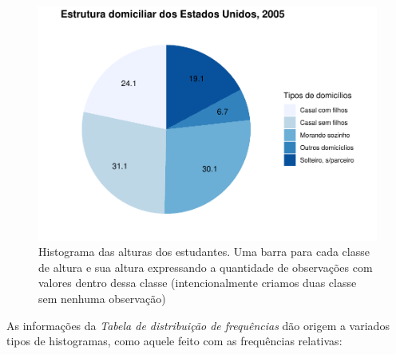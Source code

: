 \documentclass[
]{book}
\newenvironment{Shaded}{\begin{snugshade}}{\end{snugshade}}
\newcommand{\AttributeTok}[1]{\textcolor[rgb]{0.77,0.63,0.00}{#1}}
\newcommand{\DecValTok}[1]{\textcolor[rgb]{0.00,0.00,0.81}{#1}}
\newcommand{\FloatTok}[1]{\textcolor[rgb]{0.00,0.00,0.81}{#1}}
\newcommand{\FunctionTok}[1]{\textcolor[rgb]{0.00,0.00,0.00}{#1}}
\newcommand{\NormalTok}[1]{#1}
\newcommand{\OtherTok}[1]{\textcolor[rgb]{0.56,0.35,0.01}{#1}}
\newcommand{\SpecialCharTok}[1]{\textcolor[rgb]{0.00,0.00,0.00}{#1}}
\newcommand{\StringTok}[1]{\textcolor[rgb]{0.31,0.60,0.02}{#1}}
\begin{document}
\begin{Shaded}
\end{Shaded}

\begin{figure}
\centering
\includegraphics{apostila_files/figure-latex/unnamed-chunk-55-1.pdf}
\caption{\label{fig:unnamed-chunk-55}Histograma das alturas dos estudantes. Uma barra para cada classe de altura e sua altura expressando a quantidade de observações com valores dentro dessa classe (intencionalmente criamos duas classe sem nenhuma observação)}
\end{figure}

As informações da \emph{Tabela de distribuição de frequências} dão origem a variados tipos de histogramas, como aquele feito com as frequências relativas:
\end{document}
